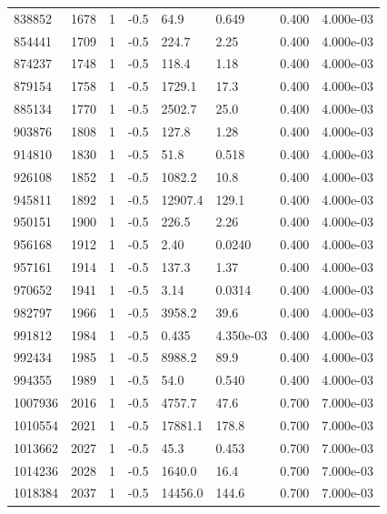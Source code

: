 \documentclass[preview]{standalone}
\begin{document}
{{{{{{{\begin{tabular}{L{1.2cm}C{1.2cm} C{0.3cm}C{0.5cm} C{1.4cm}C{1.4cm} C{1.4cm}C{1.4cm}}
  838852  &  1678  & 1     & -0.5 &  64.9  & 0.649  & 0.400 &  4.000e-03   \\ 
  854441  &  1709  & 1     & -0.5 &  224.7  & 2.25  & 0.400 &  4.000e-03   \\ 
  874237  &  1748  & 1     & -0.5 &  118.4  & 1.18  & 0.400 &  4.000e-03   \\ 
  879154  &  1758  & 1     & -0.5 &  1729.1  & 17.3  & 0.400 &  4.000e-03   \\ 
  885134  &  1770  & 1     & -0.5 &  2502.7  & 25.0  & 0.400 &  4.000e-03   \\ 
  903876  &  1808  & 1     & -0.5 &  127.8  & 1.28  & 0.400 &  4.000e-03   \\ 
  914810  &  1830  & 1     & -0.5 &  51.8  & 0.518  & 0.400 &  4.000e-03   \\ 
  926108  &  1852  & 1     & -0.5 &  1082.2  & 10.8  & 0.400 &  4.000e-03   \\ 
  945811  &  1892  & 1     & -0.5 &  12907.4  & 129.1  & 0.400 &  4.000e-03   \\ 
  950151  &  1900  & 1     & -0.5 &  226.5  & 2.26  & 0.400 &  4.000e-03   \\ 
  956168  &  1912  & 1     & -0.5 &  2.40  & 0.0240  & 0.400 &  4.000e-03   \\ 
  957161  &  1914  & 1     & -0.5 &  137.3  & 1.37  & 0.400 &  4.000e-03   \\ 
  970652  &  1941  & 1     & -0.5 &  3.14  & 0.0314  & 0.400 &  4.000e-03   \\ 
  982797  &  1966  & 1     & -0.5 &  3958.2  & 39.6  & 0.400 &  4.000e-03   \\ 
  991812  &  1984  & 1     & -0.5 &  0.435  & 4.350e-03  & 0.400 &  4.000e-03   \\ 
  992434  &  1985  & 1     & -0.5 &  8988.2  & 89.9  & 0.400 &  4.000e-03   \\ 
  994355  &  1989  & 1     & -0.5 &  54.0  & 0.540  & 0.400 &  4.000e-03   \\ 
  1007936  &  2016  & 1     & -0.5 &  4757.7  & 47.6  & 0.700 &  7.000e-03   \\ 
  1010554  &  2021  & 1     & -0.5 &  17881.1  & 178.8  & 0.700 &  7.000e-03   \\ 
  1013662  &  2027  & 1     & -0.5 &  45.3  & 0.453  & 0.700 &  7.000e-03   \\ 
  1014236  &  2028  & 1     & -0.5 &  1640.0  & 16.4  & 0.700 &  7.000e-03   \\ 
  1018384  &  2037  & 1     & -0.5 &  14456.0  & 144.6  & 0.700 &  7.000e-03   \\ 

\end{tabular}}}}}}}}
\end{document}
